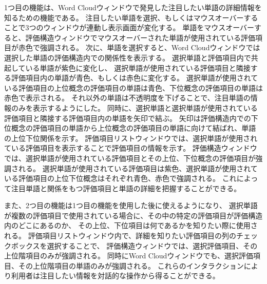 \documentclass[syuuron]{kuee}
\begin{document}
			1つ目の機能は、Word Cloudウィンドウで発見した注目したい単語の詳細情報を知るための機能である。
			注目したい単語を選択、もしくはマウスオーバーすることで3つのウィンドウが連動し表示画面が変化する。
			単語をマウスオーバーすると、評価構造ウィンドウでマウスオーバーされた単語が使用されている評価項目が赤色で強調される。
			次に、単語を選択すると、Word Cloudウィンドウでは選択した単語の評価構造内での関係性を表示する。
			選択単語と評価項目内で共起している単語が紫色に変化し、
			選択単語が使用されている評価項目と隣接する評価項目内の単語が青色、もしくは赤色に変化する。
			選択単語が使用されている評価項目の上位概念の評価項目の単語は青色、下位概念の評価項目の単語は赤色で表示される。
			それ以外の単語は不透明度を下げることで、注目単語の情報のみを表示するようにした。
			同時に、選択単語と選択単語が使用されている評価項目と隣接する評価項目内の単語を矢印で結ぶ。
			矢印は評価構造内での下位概念の評価項目の単語から上位概念の評価項目の単語に向けて結ばれ、単語の上位下位関係を示す。
			評価項目リストウィンドウでは、選択単語が使用されている評価項目を表示することで評価項目の情報を示す。
			評価構造ウィンドウでは、選択単語が使用されている評価項目とその上位、下位概念の評価項目が強調される。
			選択単語が使用されている評価項目は紫色、選択単語が使用されている評価項目の上位下位概念はそれぞれ青色、赤色で強調される。
			これによって注目単語と関係をもつ評価項目と単語の詳細を把握することができる。
			
			また、2つ目の機能は1つ目の機能を使用した後に使えるようになり、
			選択単語が複数の評価項目で使用されている場合に、その中の特定の評価項目が評価構造内のどこにあるのか、
			その上位、下位項目は何であるかを知りたい際に使用される。
			評価項目リストウィンドウ内で、詳細を知りたい評価項目の列のチェックボックスを選択することで、
			評価構造ウィンドウでは、選択評価項目、その上位階項目のみが強調される。
			同時にWord Cloudウィンドウでも、選択評価項目、その上位階項目の単語のみが強調される。
			これらのインタラクションにより利用者は注目したい情報を対話的な操作から得ることができる。
			
\end{document}
